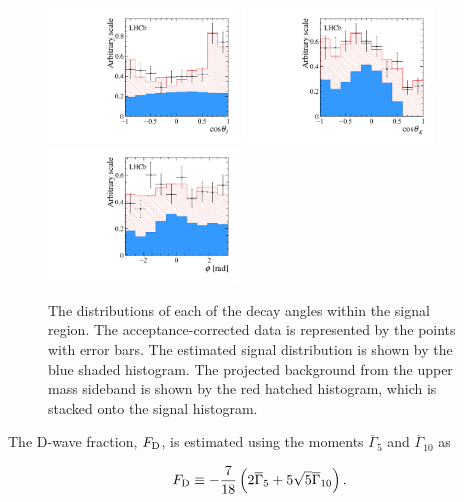 \begin{figure}[!tb]
  \centering
  \includegraphics[width=0.45\textwidth]{figs/kpimm/angular-analysis/costhetal.pdf}
  \includegraphics[width=0.45\textwidth]{figs/kpimm/angular-analysis/costhetak.pdf}\\
  \includegraphics[width=0.45\textwidth]{figs/kpimm/angular-analysis/phi.pdf}
  \caption{The distributions of each of the decay angles within the signal region. The acceptance-corrected data is represented by the points with error bars. The estimated signal distribution is shown by the blue shaded histogram. The projected background from the upper mass sideband is shown by the red hatched histogram, which is stacked onto the signal histogram.}
  \label{fig:gof_spd}
\end{figure}

The D-wave fraction, $F_{\rm D}$, is estimated using the moments $\overline{\Gamma}_{5}$ and $\overline{\Gamma}_{10}$ as 

\begin{equation}
F_{\rm D} \equiv  \displaystyle - \frac{7}{18} \left(2 \overline{\Gamma}_{5} + 5 \sqrt{5} \overline{\Gamma}_{10} \right).
\end{equation}

